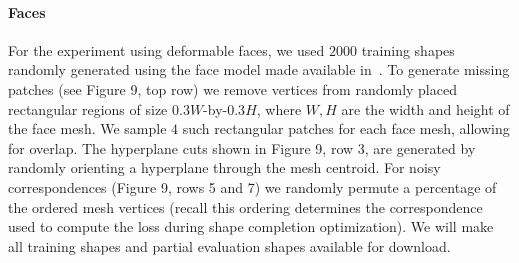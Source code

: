 \paragraph{Faces}
For the experiment using deformable faces, we used $2000$ training shapes randomly generated using the face model made available in~\cite{gerig2017morphable}. To generate missing patches (see Figure 9, top row) we remove vertices from randomly placed rectangular regions of size $0.3W$-by-$0.3H$, where $W,H$ are the width and height of the face mesh. We sample $4$ such rectangular patches for each face mesh, allowing for overlap. The hyperplane cuts shown in Figure 9, row 3, are generated by randomly orienting a hyperplane through the mesh centroid. For noisy correspondences (Figure 9, rows 5 and 7) we randomly permute a percentage of the ordered mesh vertices (recall this ordering determines the correspondence used to compute the loss during shape completion optimization). We will make all training shapes and partial evaluation shapes available for download.




